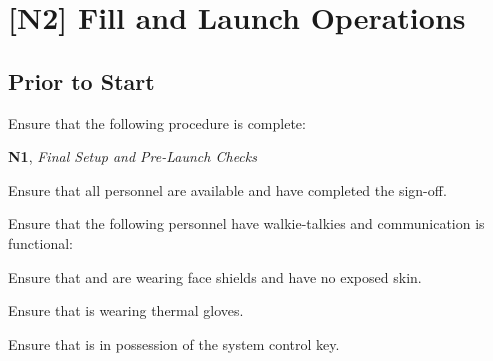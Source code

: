 \section{[N2] Fill and Launch Operations} 
\subsection{Prior to Start}
\begin{checklist}
    \item Ensure that the following procedure is complete:
    \begin{checklist}
        \item \textbf{N1}, \textit{Final Setup and Pre-Launch Checks}
    \end{checklist}
    \item Ensure that all personnel are available and have completed the sign-off.
    \item Ensure that the following personnel have walkie-talkies and communication is functional:
    \begin{checklist}
        \item \ops{}
        \item \control{}
        \item \primary{}
        \item \secondary{}
    \end{checklist}
    \item Ensure that \primary{} and \secondary{} are wearing face shields and have no exposed skin.
    \item Ensure that \primary{} is wearing thermal gloves.
    \item Ensure that \ops{} is in possession of the system control key.
\end{checklist}
\setcounter{checklistnum}{0}

